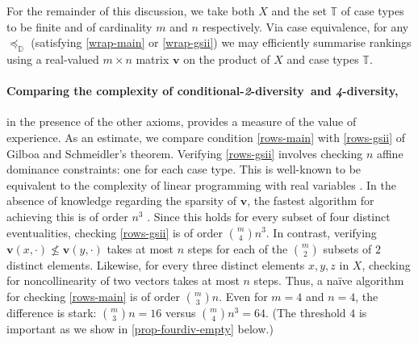 \documentclass[12pt,a4paper,twoside]{article}
\newcommand{\mbbd}{{\mathds D}}
\newcommand{\mbbt}{{\mathds {T}}}
\newcommand{\condtwodiv}{\textup{conditional-\textit{2}-diversity}}
\newcommand{\fourdiv}{\textit{4}-\textup{diversity}}
\begin{document}
For the remainder of this discussion, we take both $X$ and the set $\mbbt$ of
case types to be finite and of cardinality $m$ and $n$ respectively. Via case
equivalence, for any $\preceq_{\mbbd}$ (satisfying \ref{wrap-main} or
\ref{wrap-gsii}) we may efficiently summarise rankings using a real-valued
$m\times n$ matrix $\mathbf{v}$ on the product of $X$ and case types $ \mbbt$.

\paragraph{Comparing the complexity of \condtwodiv\ and \fourdiv,}\hskip-8pt in
the presence of the other axioms, provides a measure of the value of
experience. As an estimate, we compare condition \ref{rows-main} with
\ref{rows-gsii} of Gilboa and Schmeidler's theorem.  Verifying \ref{rows-gsii}
involves checking $n$ affine dominance constraints: one for each case type. This
is well-known to be equivalent to the complexity of linear programming with real
variables \textup{\citep{DR-Linear_programming}}. In the absence of knowledge
regarding the sparsity of $\mathbf v$, the fastest algorithm for achieving this
is of order $n^{3}$ \textup{\citep{LS_Linear_programming}}. Since this holds for
every subset of four distinct eventualities, checking \ref{rows-gsii} is of
order $\binom{m}{4}n^{3}$.  In contrast, verifying
$\mathbf{v}(x,\cdot )\not \leq \mathbf{v}(y,\cdot)$ takes at most $n$ steps for
each of the $\binom{m}{2}$ subsets of $2$ distinct elements. Likewise, for every
three distinct elements $x,y,z$ in $X$, checking for noncollinearity of two
vectors takes at most $n$ steps. Thus, a na\"{i}ve algorithm for checking
\ref{rows-main} is of order $\binom{m}{3}n$. Even for $m = 4 $ and $n = 4$, the
difference is stark: $\binom{m}{3}n = 16$ versus $ \binom{m}{4} n^3 = 64$. (The
threshold $4$ is important as we show in \cref{prop-fourdiv-empty} below.)
\end{document}
